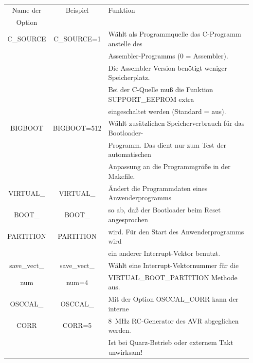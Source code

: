 \begin{table}[H]
  \begin{center}
    \begin{tabular}{| c | c | l |}
    \hline
   Name der        & Beispiel       & Funktion                                            \\
    Option         &                &                                                     \\
    \hline
    \hline
 C\_SOURCE         & C\_SOURCE=1    & Wählt als Programmquelle das C-Programm anstelle des  \\
                   &                & Assembler-Programms (0 = Assembler).\\
                   &                & Die Assembler Version benötigt weniger Speicherplatz. \\
                   &                & Bei der C-Quelle muß die Funktion SUPPORT\_EEPROM extra \\
                   &                & eingeschaltet werden (Standard = aus). \\
    \hline
 BIGBOOT           & BIGBOOT=512    & Wählt zusätzlichen Speicherverbrauch für das Bootloader- \\
                   &                & Programm. Das dient nur zum Test der automatischen \\
                   &                & Anpassung an die Programmgröße in der Makefile. \\
    \hline
VIRTUAL\_          & VIRTUAL\_       &  Ändert die Programmdaten eines Anwenderprogramms \\
 BOOT\_            & BOOT\_          & so ab, daß der Bootloader beim Reset angesprochen \\
 PARTITION         & PARTITION       & wird. Für den Start des Anwenderprogramms wird \\
		   &                 & ein anderer Interrupt-Vektor benutzt.          \\
    \hline
 save\_vect\_      & save\_vect\_    & Wählt eine Interrupt-Vektornummer für die  \\
      num          &    num=4        & VIRTUAL\_BOOT\_PARTITION Methode aus.        \\
    \hline
 OSCCAL\_          & OSCCAL\_       & Mit der Option OSCCAL\_CORR kann der interne \\
 CORR              & CORR=5         & 8~MHz RC-Generator des AVR abgeglichen werden. \\
                   &                & Ist bei Quarz-Betrieb oder externem Takt unwirksam! \\

\end{tabular}
\end{center}
\end{table}

